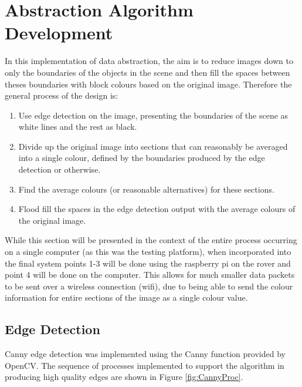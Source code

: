 \chapter{Abstraction Algorithm Development}

In this implementation of data abstraction, the aim is to reduce images down to only the boundaries of the objects in the scene and then fill the spaces between theses boundaries with block colours based on the original image. Therefore the general process of the design is:
\begin{enumerate}
    \item Use edge detection on the image, presenting the boundaries of the scene as white lines and the rest as black. 
    \item Divide up the original image into sections that can reasonably be averaged into a single colour, defined by the boundaries produced by the edge detection or otherwise.
    \item Find the average colours (or reasonable alternatives) for these sections.
    \item Flood fill the spaces in the edge detection output with the average colours of the original image.
\end{enumerate}
While this section will be presented in the context of the entire process occurring on a single computer (as this was the testing platform), when incorporated into the final system points 1-3 will be done using the raspberry pi on the rover and point 4 will be done on the computer. This allows for much smaller data packets to be sent over a wireless connection (wifi), due to being able to send the colour information for entire sections of the image as a single colour value.

\section{Edge Detection}

Canny edge detection was implemented using the Canny function provided by OpenCV. The sequence of processes implemented to support the algorithm in producing high quality edges are shown in Figure \ref{fig:CannyProc}. 

